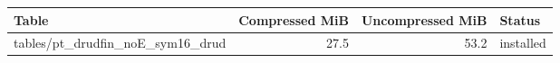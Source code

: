 {\small
\begin{tabular}{lrrl}
\hline
Table & Compressed MiB & Uncompressed MiB & Status \\
\hline
tables/pt\_drudfin\_noE\_sym16\_drud & 27.5 & 53.2 & installed \\
\hline
\end{tabular}
}
